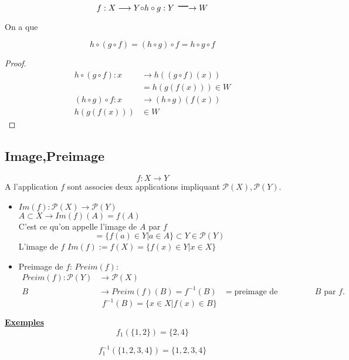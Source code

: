 \documentclass[../main.tex]{subfiles}
\begin{document}
\[ 
	f: X \longrightarrow Y \huge{\circ} h \circ g : Y \longrightarrow W
\]

On a que 

\begin{thm}\label{thm:composition_de_fonctions}
	
\[ 
	h \circ ( g \circ f) = ( h \circ g) \circ f = h \circ g \circ f
\]
\end{thm}
\begin{proof}
	\begin{align*}
		h \circ ( g \circ f) : x &\longrightarrow h((g\circ f) ( x))\\
	&= h(g(f(x))) \in W\\
		( h\circ g) \circ f : x &\longrightarrow ( h\circ g) ( f(x))\\
		h(g(f(x))) &\in W
	\end{align*}



\end{proof}
\subsection{Image,Preimage}
\[ 
f: X \longrightarrow Y
\]
A l'application $f$ sont associes deux applications impliquant $\mathcal{P}(X), \mathcal{P}(Y)$.
\begin{itemize}
	\item $Im(f): \mathcal{P}(X) \longrightarrow \mathcal{P}(Y)$\\
		$A \subset X  \longrightarrow  Im(f)(A)=f(A)$\\
		C'est ce qu'on appelle l'image de $A$ par $f$ 
		\[ 
			= \{ f(a) \in Y \vert a \in A\} \subset Y \in \mathcal{P}(Y)
		\]
		L'image de $f$ $Im(f) := f(X) = \{f(x) \in Y \vert x \in X\}$

	\item Preimage de  $f$: $Preim(f)$:
		\begin{align*}
			Preim(f): \mathcal{P}(Y) &\longrightarrow \mathcal{P}(X)\\
			B &\longrightarrow Preim(f)(B) = f^{-1}(B)
			  &= \text{preimage de l'ensemble $B$ par $f$.}
		\end{align*}
		\[ 
			f^{-1}(B) = \{x \in X \vert f(x) \in B\}
		\]
\end{itemize}

\textbf{\underline{Exemples}}\\

\[ 
	f_1(\{1,2\}) = \{2,4\}
\]

\[ 
	f_1^{-1}(\{1,2,3,4\}) = \{1,2,3,4\}
\]
\end{document}
